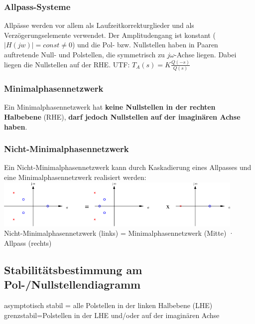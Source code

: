 \subsubsection{Allpass-Systeme}
Allpässe werden vor allem als Laufzeitkorrekturglieder und als
Verzögerungselemente verwendet. Der Amplitudengang ist konstant ($|H(jw)| =
const \neq 0$) und die Pol- bzw. Nullstellen haben in Paaren auftretende Null-
und Polstellen, die symmetrisch zu $j \omega$-Achse liegen. Dabei liegen die
Nullstellen auf der RHE.
UTF: $T_A(s) = K
\frac{Q(-s)}{Q(s)}$


\subsubsection{Minimalphasennetzwerk}
Ein Minimalphasennetzwerk hat \textbf{keine Nullstellen in der rechten
Halbebene} (RHE), \textbf{darf jedoch Nullstellen auf der imaginären Achse
haben}.

\subsubsection{Nicht-Minimalphasennetzwerk}
Ein Nicht-Minimalphasennetzwerk kann durch Kaskadierung eines Allpasses und
eine Minimalphasennetzwerk realisiert werden:\\
\includegraphics[width=12cm]{./bilder/nicht-minimalphasennetzwerk.png}\\
Nicht-Minimalphasennetzwerk (links) = Minimalphasennetzwerk (Mitte) · Allpass (rechts)

\subsection{Stabilitätsbestimmung am Pol-/Nullstellendiagramm}
asymptotisch stabil = alle Polstellen in der
linken Halbebene (LHE)\\
grenzstabil=Polstellen in der LHE und/oder auf der
imaginären Achse

